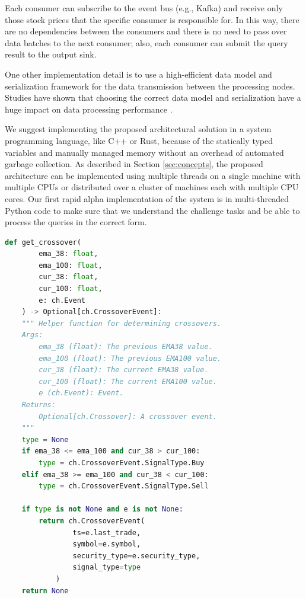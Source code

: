 Each consumer can subscribe to the event bus (e.g., Kafka) and receive only those stock prices that the specific consumer is responsible
for. In this way, there are no dependencies between the consumers and there is no need to pass over data batches to the next
consumer; also, each consumer can submit the query result to the output sink.

One other implementation detail is to use a high-efficient data model and serialization framework for the data transmission between
the processing nodes. Studies have shown that choosing the correct data model and serialization have a huge impact on data processing performance \cite{DBLP:conf/cloud/SikdarTJ17}.

We suggest implementing the proposed architectural solution in a system programming language, like C++ or Rust, because of the statically typed variables 
and manually managed memory without an overhead of automated garbage collection. As described in Section \ref{sec:concepts}, the proposed architecture 
can be implemented using multiple threads on a single machine with multiple CPUs or distributed over a cluster of machines each with multiple CPU cores.
Our first rapid alpha implementation of the system is in multi-threaded Python code to make sure that we understand the challenge tasks and be able to process the queries in the correct form.






\begin{minipage}{0.8\linewidth}
    \begin{lstlisting}[caption={The computation for Query 2 - Breakout Patterns of EMA38 and EMA100}, label={lst:query2},language=Python]
    def get_crossover(
        ema_38: float,
        ema_100: float,
        cur_38: float,
        cur_100: float,
        e: ch.Event
    ) -> Optional[ch.CrossoverEvent]:
    """ Helper function for determining crossovers.
    Args:
        ema_38 (float): The previous EMA38 value.
        ema_100 (float): The previous EMA100 value.
        cur_38 (float): The current EMA38 value.
        cur_100 (float): The current EMA100 value.
        e (ch.Event): Event.
    Returns:
        Optional[ch.Crossover]: A crossover event.
    """
    type = None
    if ema_38 <= ema_100 and cur_38 > cur_100:
        type = ch.CrossoverEvent.SignalType.Buy
    elif ema_38 >= ema_100 and cur_38 < cur_100:
        type = ch.CrossoverEvent.SignalType.Sell

    if type is not None and e is not None:
        return ch.CrossoverEvent(
                ts=e.last_trade,
                symbol=e.symbol,
                security_type=e.security_type,
                signal_type=type
            )
    return None
\end{lstlisting}
\end{minipage}
